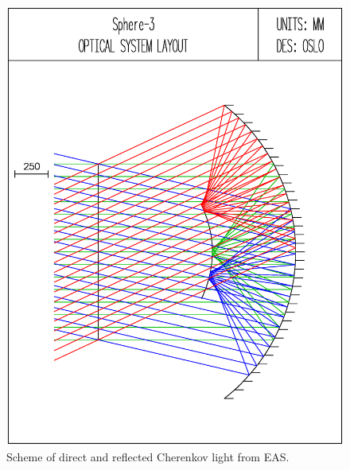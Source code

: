 \documentclass[a4paper,11pt]{article}
\begin{document}
\begin{figure}
\begin{minipage}[b]{.42\textwidth}
        \caption{Scheme of direct and reflected Cherenkov light from EAS.}
        \label{fig:DirectCL}
    \end{minipage}
    \hfill
    \begin{minipage}[b]{.55\textwidth}
        \centering 
        \includegraphics[height=.2\textheight, angle=0]{Sphere3optic.eps}

\end{minipage}
\end{figure}
\end{document}
